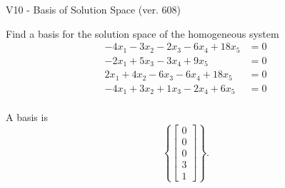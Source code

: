 \begin{exercise}
  \begin{exerciseTitle}V10 - Basis of Solution Space (ver. 608)\end{exerciseTitle}
  \begin{exerciseStatement}
    Find a basis for the solution space of the homogeneous system 
\begin{align*}
 -4 x_ 1 -3 x_ 2 -2 x_ 3 -6 x_ 4 + 18 x_ 5 &= 0  \\ 
  -2 x_ 1 + 5 x_ 3 -3 x_ 4 + 9 x_ 5 &= 0  \\ 
  2 x_ 1 + 4 x_ 2 -6 x_ 3 -6 x_ 4 + 18 x_ 5 &= 0  \\ 
  -4 x_ 1 + 3 x_ 2 + 1 x_ 3 -2 x_ 4 + 6 x_ 5 &= 0  \\ 
 \end{align*}


 
  \end{exerciseStatement}

  \begin{exerciseAnswer}
   A basis is   
\[\left\{\left[\begin{array}{c}
0 \\
0 \\
0 \\
3 \\
1
\end{array}\right]\right\}.\]

  


  \end{exerciseAnswer}
\end{exercise}